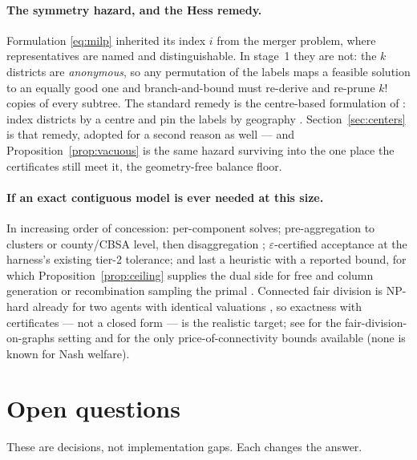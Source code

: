 \documentclass[11pt]{article}
\theoremstyle{definition}
\begin{document}
\paragraph{The symmetry hazard, and the Hess remedy.}
Formulation \eqref{eq:milp} inherited its index $i$ from the merger problem, where
representatives are named and distinguishable. In stage~1 they are not: the $k$ districts
are \emph{anonymous}, so any permutation of the labels maps a feasible solution to an
equally good one and branch-and-bound must re-derive and re-prune $k!$ copies of every
subtree. The standard remedy is the centre-based formulation of \citet{hess1971}: index
districts by a centre and pin the labels by geography
\citep{zoltners2005,salazaraguilar2011,rosmercado2012}. Section~\ref{sec:centers} is that
remedy, adopted for a second reason as well --- and Proposition~\ref{prop:vacuous} is the
same hazard surviving into the one place the certificates still meet it, the geometry-free
balance floor.

\paragraph{If an exact contiguous model is ever needed at this size.}
In increasing order of concession: per-component solves; pre-aggregation to clusters or
county/CBSA level, then disaggregation \citep{karypis1998}; $\varepsilon$-certified
acceptance at the harness's existing tier-2 tolerance; and last a heuristic with a reported
bound, for which Proposition~\ref{prop:ceiling} supplies the dual side for free and column
generation or recombination sampling the primal \citep{gurnee2021,deford2021,bozkaya2003}.
Connected fair division is NP-hard already for two agents with identical valuations
\citep{deligkas2021}, so exactness with certificates --- not a closed form --- is the
realistic target; see \citet{bouveret2017,bilo2022,suksompong2019} for the
fair-division-on-graphs setting and \citet{bei2022} for the only price-of-connectivity
bounds available (none is known for Nash welfare).

\section{Open questions}\label{sec:open}

These are decisions, not implementation gaps. Each changes the answer.
\end{document}
